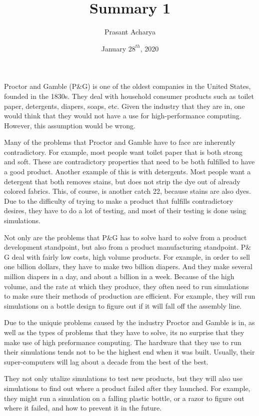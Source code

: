 \documentclass{article}
\title{Summary 1}
\author{Prasant Acharya}
\date{January $28^{th}$, 2020}
\begin{document}
\maketitle
Proctor and Gamble (P$\&$G) is one of the oldest companies in the United
States, founded in the 1830s. They deal with household consumer products
such as toilet paper, detergents, diapers, soaps, etc. Given the industry that
they are in, one would think that they would not have a use for high-performance
computing. However, this assumption would be wrong.\par

Many of the problems that Proctor and Gamble have to face are inherently
contradictory. For example, most people want toilet paper that is both strong
and soft. These are contradictory properties that need to be both fulfilled
to have a good product. Another example of this is with detergents. Most
people want a detergent that both removes stains, but does not strip the dye
out of already colored fabrics. This, of course, is another catch 22, because stains
are also dyes. Due to the difficulty of trying to make a product that fulfills
contradictory desires, they have to do a lot of testing, and most of their testing
is done using simulations.\par

Not only are the problems that P$\&$G has to solve hard to solve from a product development standpoint, but also from a product manufacturing standpoint. P$\&$G deal with fairly low costs, high volume products. For example, in order to
sell one billion dollars, they have to make two billion diapers. And they make
several million diapers in a day, and about a billion in a week. Because of the
high volume, and the rate at which they produce, they often need to run simulations to make sure their methods of production are efficient. For example,
they will run simulations on a bottle design to figure out if it will fall off the
assembly line.\par

Due to the uniquie problems caused by the industry Proctor and Gamble is
in, as well as the types of problems that they have to solve, its no surprise that
they make use of high preformance computing. The hardware that they use to
run their simulations tends not to be the highest end when it was built. Usually,
their super-computers will lag about a decade from the best of the best.\par

They not only utalize simulations to test new products, but they will also
use simulations to find out where a product failed after they launched. For
example, they might run a simulation on a falling plastic bottle, or a razor to
figure out where it failed, and how to prevent it in the future.
\end{document}
